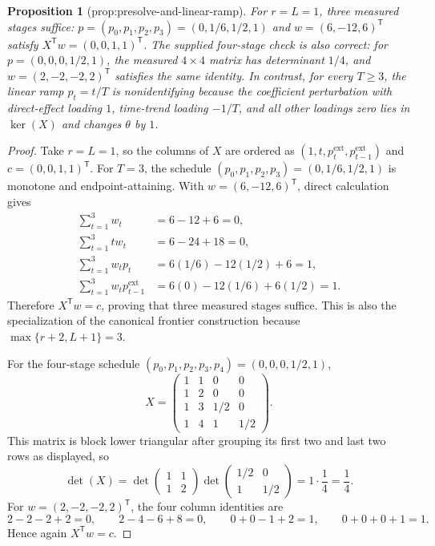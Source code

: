 \documentclass{article}
\newtheorem{proposition}{Proposition}
\begin{document}
\begin{proposition}[prop:presolve-and-linear-ramp]\label{prop:presolve-and-linear-ramp}
For \(r=L=1\), three measured stages suffice: \(p=(p_0,p_1,p_2,p_3)=(0,1/6,1/2,1)\) and \(w=(6,-12,6)^{\mathsf T}\) satisfy \(X^{\mathsf T}w=(0,0,1,1)^{\mathsf T}\). The supplied four-stage check is also correct: for \(p=(0,0,0,1/2,1)\), the measured \(4\times4\) matrix has determinant \(1/4\), and \(w=(2,-2,-2,2)^{\mathsf T}\) satisfies the same identity. In contrast, for every \(T\ge3\), the linear ramp \(p_t=t/T\) is nonidentifying because the coefficient perturbation with direct-effect loading \(1\), time-trend loading \(-1/T\), and all other loadings zero lies in \(\ker(X)\) and changes \(\theta\) by \(1\).
\end{proposition}
\begin{proof}
Take \(r=L=1\), so the columns of \(X\) are ordered as \((1,t,p_t^{\mathrm{ext}},p_{t-1}^{\mathrm{ext}})\) and \(c=(0,0,1,1)^{\mathsf T}\).  For \(T=3\), the schedule \((p_0,p_1,p_2,p_3)=(0,1/6,1/2,1)\) is monotone and endpoint-attaining.  With \(w=(6,-12,6)^{\mathsf T}\), direct calculation gives
\[
\begin{aligned}
 \sum_{t=1}^{3}w_t&=6-12+6=0,\\
 \sum_{t=1}^{3}tw_t&=6-24+18=0,\\
 \sum_{t=1}^{3}w_tp_t&=6(1/6)-12(1/2)+6=1,\\
 \sum_{t=1}^{3}w_tp_{t-1}^{\mathrm{ext}}&=6(0)-12(1/6)+6(1/2)=1.
\end{aligned}
\]
Therefore \(X^{\mathsf T}w=c\), proving that three measured stages suffice.  This is also the specialization of the canonical frontier construction because \(\max\{r+2,L+1\}=3\).

For the four-stage schedule \((p_0,p_1,p_2,p_3,p_4)=(0,0,0,1/2,1)\),
\[
 X=
 \begin{pmatrix}
 1&1&0&0\\
 1&2&0&0\\
 1&3&1/2&0\\
 1&4&1&1/2
 \end{pmatrix}.
\]
This matrix is block lower triangular after grouping its first two and last two rows as displayed, so
\[
 \det(X)
 =\det\!\begin{pmatrix}1&1\\1&2\end{pmatrix}
  \det\!\begin{pmatrix}1/2&0\\1&1/2\end{pmatrix}
 =1\cdot\frac14=\frac14.
\]
For \(w=(2,-2,-2,2)^{\mathsf T}\), the four column identities are
\[
 2-2-2+2=0,\qquad
 2-4-6+8=0,\qquad
 0+0-1+2=1,\qquad
 0+0+0+1=1.
\]
Hence again \(X^{\mathsf T}w=c\).


\end{proof}
\end{document}
